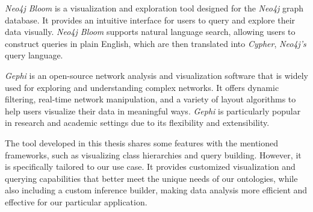 \textit{Neo4j Bloom} \cite{neo4j} is a visualization and exploration tool designed for the \textit{Neo4j} graph database. It provides an intuitive interface for users to query and explore their data visually. \textit{Neo4j Bloom} \cite{neo4j} supports natural language search, allowing users to construct queries in plain English, which are then translated into \textit{Cypher}, \textit{Neo4j's} query language.

\textit{Gephi} \cite{gephi} is an open-source network analysis and visualization software that is widely used for exploring and understanding complex networks. It offers dynamic filtering, real-time network manipulation, and a variety of layout algorithms to help users visualize their data in meaningful ways. \textit{Gephi} \cite{gephi} is particularly popular in research and academic settings due to its flexibility and extensibility.

The tool developed in this thesis shares some features with the mentioned frameworks, such as visualizing class hierarchies and query building. However, it is specifically tailored to our use case. It provides customized visualization and querying capabilities that better meet the unique needs of our ontologies, while also including a custom inference builder, making data analysis more efficient and effective for our particular application.